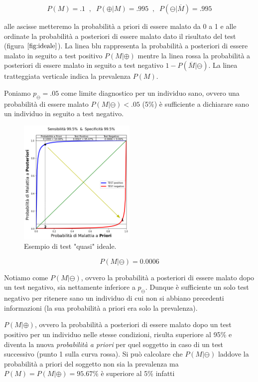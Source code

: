 \documentclass[11pt]{article}
\begin{document}
\begin{equation}\label{eq:ex995}
P(M) = .1 \; \; ,\; \; P(\oplus|M) = .995 \; \; ,\; \; P(\ominus|\overline{M}) = .995
\end{equation}

alle ascisse metteremo la probabilità a priori di essere malato da 0 a 1
e alle ordinate la probabilità a posteriori di essere malato dato il
risultato del test (figura \(\ref{fig:ideale}\)). La linea blu
rappresenta la probabilità a posteriori di essere malato in seguito a
test positivo \(P(M|\oplus)\) mentre la linea rossa la probabilità a
posteriori di essere malato in seguito a test negativo
\(1 - P(\overline{M}|\ominus)\). La linea tratteggiata verticale indica
la prevalenza \(P(M)\).

Poniamo \(p_{\ominus}=.05\) come limite diagnostico per un individuo
sano, ovvero una probabilità di essere malato \(P(M|\ominus)<.05\) (5\%)
è sufficiente a dichiarare sano un individuo in seguito a test negativo.

    
        \begin{figure}
        \centering
            \includegraphics[width=0.5\textwidth,height=0.5\textheight,keepaspectratio]{ideale.png}
            \caption{Esempio di test "quasi" ideale.}
            \label{fig:ideale}
        \end{figure}

    
    \[ P(M|\ominus) = 0.0006 \]

    
    Notiamo come \(P(M|\ominus)\), ovvero la probabilità a posteriori di
essere malato dopo un test negativo, sia nettamente inferiore a
\(p_{\ominus}\). Dunque è sufficiente un solo test negativo per ritenere
sano un individuo di cui non si abbiano precedenti informazioni (la sua
probabilità a priori era solo la prevalenza).

\(P(M|\oplus)\), ovvero la probabilità a posteriori di essere malato
dopo un test positivo per un individuo nelle stesse condizioni, risulta
superiore al 95\% e diventa la nuova \emph{probabilità a priori} per
quel soggetto in caso di un test successivo (punto 1 sulla curva rossa).
Si può calcolare che \(P(M|\ominus)\) laddove la probabilità a priori
del soggetto non sia la prevalenza ma \(P(M)=P(M|\oplus)=95.67\%\) è
superiore al 5\% infatti
\end{document}
